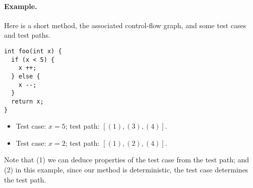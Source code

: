 \documentclass[11pt]{article}
\begin{document}
\newpage
\paragraph{Example.} Here is a short method, the associated control-flow
graph, and some test cases and test paths.

\begin{center}
\begin{minipage}{10em}
\vspace*{-8em}
\begin{lstlisting}
int foo(int x) {
  if (x < 5) {
    x ++;
  } else {
    x --;
  }
  return x;
}
\end{lstlisting}
\end{minipage}
\end{center}

\begin{itemize}
\item Test case: $x = 5$; test path: $[(1), (3), (4)]$.
\item Test case: $x = 2$; test path: $[(1), (2), (4)]$.
\end{itemize}

Note that (1) we can deduce properties of the test case from the test path; and
(2) in this example, since our method is deterministic, the test case 
determines the test path.
\end{document}
